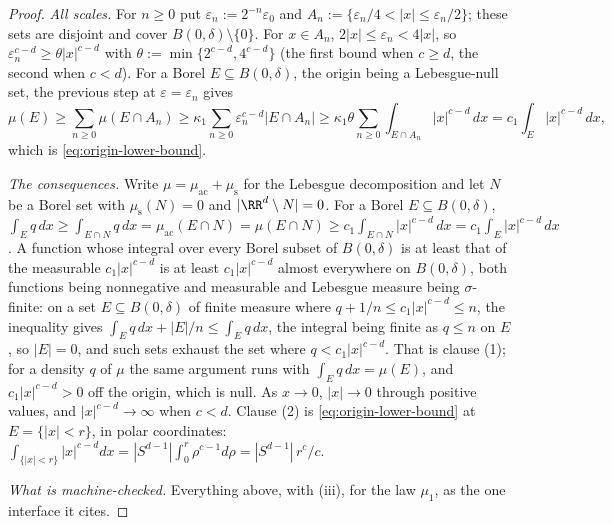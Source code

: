 \begin{proof}
\emph{All scales.} For $n \ge 0$ put $\varepsilon_n := 2^{-n}\varepsilon_0$ and
$A_n := \{\varepsilon_n/4 < |x| \le \varepsilon_n/2\}$; these sets are disjoint and cover
$B(0,\delta)\setminus\{0\}$. For $x \in A_n$, $2|x| \le \varepsilon_n < 4|x|$, so
$\varepsilon_n^{c-d} \ge \theta|x|^{c-d}$ with $\theta := \min\{2^{c-d},4^{c-d}\}$ (the first bound
when $c \ge d$, the second when $c < d$). For a Borel $E \subseteq B(0,\delta)$, the origin being a
Lebesgue-null set, the previous step at $\varepsilon = \varepsilon_n$ gives
\[
  \mu(E) \ge \sum_{n\ge0}\mu(E \cap A_n)
   \ge \kappa_1\sum_{n\ge0}\varepsilon_n^{c-d}|E \cap A_n|
   \ge \kappa_1\theta\sum_{n\ge0}\int_{E\cap A_n}|x|^{c-d}\,dx
   = c_1\int_E|x|^{c-d}\,dx ,
\]
which is \ref{eq:origin-lower-bound}.

\emph{The consequences.} Write $\mu = \mu_{\mathrm{ac}} + \mu_{\mathrm s}$ for the Lebesgue
decomposition and let $N$ be a Borel set with $\mu_{\mathrm s}(N) = 0$ and
$|\RR^d \setminus N| = 0$. For a Borel $E \subseteq B(0,\delta)$,
$\int_E q\,dx \ge \int_{E\cap N} q\,dx = \mu_{\mathrm{ac}}(E \cap N) = \mu(E \cap N)
\ge c_1\int_{E\cap N}|x|^{c-d}\,dx = c_1\int_E|x|^{c-d}\,dx$. A function whose integral over every
Borel subset of $B(0,\delta)$ is at least that of the measurable $c_1|x|^{c-d}$ is at least
$c_1|x|^{c-d}$ almost everywhere on $B(0,\delta)$, both functions being nonnegative and measurable
and Lebesgue measure being $\sigma$-finite: on a set $E \subseteq B(0,\delta)$ of finite measure
where $q + 1/n \le c_1|x|^{c-d} \le n$, the inequality gives
$\int_E q\,dx + |E|/n \le \int_E q\,dx$, the integral being finite as $q \le n$ on $E$, so $|E| = 0$, and such sets exhaust the set
where $q < c_1|x|^{c-d}$. That is clause (1); for a density $q$ of $\mu$ the
same argument runs with $\int_E q\,dx = \mu(E)$, and $c_1|x|^{c-d} > 0$ off the origin, which is
null. As $x \to 0$, $|x| \to 0$ through positive values, and $|x|^{c-d} \to \infty$ when $c < d$.
Clause (2) is \ref{eq:origin-lower-bound} at $E = \{|x| < r\}$, in polar coordinates:
$\int_{\{|x|<r\}}|x|^{c-d}dx = |S^{d-1}|\int_0^r\rho^{c-1}d\rho = |S^{d-1}|\,r^c/c$.

\emph{What is machine-checked.} Everything above, with (iii), for the law $\mu_1$, as the
one interface it cites.
\end{proof}

